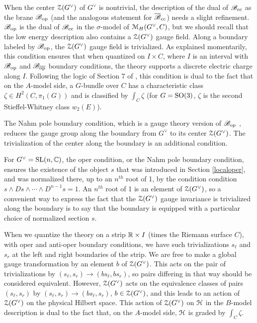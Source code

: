 \documentclass[11pt,a4paper]{article}
\begin{document}
 When the center ${\mathcal Z}(G^\vee)$ of $G^\vee$ is nontrivial, the description of the dual of ${\mathscr B}_{\mathrm{cc}}$ as the brane ${\mathscr B}_{\mathrm{op}}$ 
(and the analogous
statement for  $\overline{{\mathscr B}}_{\mathrm{cc}}$) needs a slight refinement.   ${\mathscr B}_{\mathrm{op}}$ is the dual of ${\mathscr B}_{\mathrm{cc}}$ in the $\sigma$-model of ${\mathcal M}_H(G^\vee,C)$, but we should recall
 that the low energy description  also contains a ${\mathcal Z}(G^\vee)$ gauge field.   Along a boundary labeled by ${\mathscr B}_{\mathrm{op}}$, the ${\mathcal Z}(G^\vee)$ gauge field is trivialized.
 As explained momentarily, this
  condition ensures that when quantized on $I\times C$, where $I$ is an interval with ${\mathscr B}_{\mathrm{op}}$ and ${\mathscr B}_{\overline{\mathrm{op}}}$ boundary conditions, the theory  supports
 a discrete electric charge along $I$.
 Following the logic of Section 7 of \cite{KW}, this condition is dual to the fact that on the $A$-model side, a $G$-bundle over $C$ has a characteristic
 class $\zeta \in H^2(C,\pi_1(G))$ and is classified by $\int_C\zeta$ (for $G={\mathrm{SO}}(3)$, $\zeta$ is the second Stieffel-Whitney class $w_2(E)$).    
 
 The Nahm pole boundary condition, which is a gauge theory version of ${\mathscr B}_{\mathrm{op}}$ \cite{GWknots}, reduces the gauge group along the boundary
 from $G^\vee$ to its center 
 ${\mathcal Z}(G^\vee)$.   The  trivialization of the center along the boundary is an additional condition.
 
 For $G^\vee={\mathrm{SL}}(n,{\mathbb C})$, the oper condition, or the Nahm pole boundary condition, 
 ensures the existence of the object $s$ that was introduced in Section \ref{localoper}, and
 was normalized there, up to an $n^{th}$ root of 1, by the condition condition $s\wedge Ds \wedge \cdots \wedge D^{n-1}s=1$.
An $n^{th}$ root of 1 is an element of ${\mathcal Z}(G^\vee)$, so a  convenient way to express the fact that the ${\mathcal Z}(G^\vee)$ gauge invariance
 is trivialized along the boundary is to say that the boundary is equipped with a particular choice of normalized section  $s$. 
 
 When we quantize the theory on a strip ${\mathbb{R}}\times I$ (times the Riemann surface $C$), with oper and anti-oper boundary conditions, we have 
 such trivializations $s_\ell$ and $s_r$ at the left and right boundaries of the strip.   We are free to make a global gauge transformation by an element $b$
 of  ${\mathcal Z}(G^\vee)$.   This acts on the pair of trivializations by $(s_\ell,s_r)\to (b s_\ell, b s_r)$, so pairs differing in that way should be considered equivalent.
 However, ${\mathcal Z}(G^\vee)$ acts on the 
equivalence classes of pairs $(s_\ell,s_r)$ by  
 $(s_\ell,s_r)\to (b s_\ell,s_r)$, $b\in {\mathcal Z}(G^\vee)$, and this leads to an action of ${\mathcal Z}(G^\vee)$ on the physical Hilbert space.   This action of ${\mathcal Z}(G^\vee)$ on ${\mathcal H}$
 in the $B$-model description is dual to the fact that, on the $A$-model side, ${\mathcal H}$ is graded by $\int_C \zeta$. 
 
\end{document}
